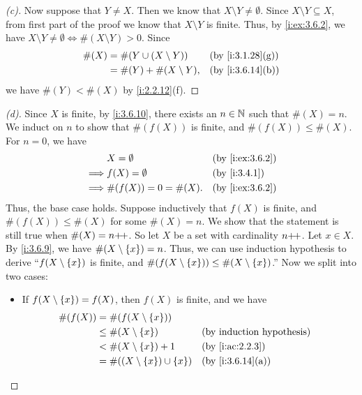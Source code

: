 \begin{proof}[(c)]
  Now suppose that \(Y \neq X\).
  Then we know that \(X \setminus Y \neq \emptyset\).
  Since \(X \setminus Y \subseteq X\), from first part of the proof we know that \(X \setminus Y\) is finite.
  Thus, by \cref{i:ex:3.6.2}, we have \(X \setminus Y \neq \emptyset \iff \#(X \setminus Y) > 0\).
  Since
  \begin{align*}
    \#(X) & = \#(Y \cup (X \setminus Y)) &  & \by{i:3.1.28}[g] \\
          & = \#(Y) + \#(X \setminus Y), &  & \by{i:3.6.14}[b]
  \end{align*}
  we have \(\#(Y) < \#(X)\) by \cref{i:2.2.12}(f).
\end{proof}

\begin{proof}[(d)]
  Since \(X\) is finite, by \cref{i:3.6.10}, there exists an \(n \in \mathbb{N}\) such that \(\#(X) = n\).
  We induct on \(n\) to show that \(\#(f(X))\) is finite, and \(\#(f(X)) \leq \#(X)\).
  For \(n = 0\), we have
  \begin{align*}
             & X = \emptyset         &  & \by{i:ex:3.6.2} \\
    \implies & f(X) = \emptyset      &  & \by{i:3.4.1}    \\
    \implies & \#(f(X)) = 0 = \#(X). &  & \by{i:ex:3.6.2}
  \end{align*}
  Thus, the base case holds.
  Suppose inductively that \(f(X)\) is finite, and \(\#(f(X)) \leq \#(X)\) for some \(\#(X) = n\).
  We show that the statement is still true when \(\#(X) = n{+}\!{+}\).
  So let \(X\) be a set with cardinality \(n{+}\!{+}\).
  Let \(x \in X\).
  By \cref{i:3.6.9}, we have \(\#(X \setminus \left\lbrace x\right\rbrace) = n\).
  Thus, we can use induction hypothesis to derive ``\(f(X \setminus \left\lbrace x\right\rbrace)\) is finite, and \(\#(f(X \setminus \left\lbrace x\right\rbrace)) \leq \#(X \setminus \left\lbrace x\right\rbrace)\).''
  Now we split into two cases:
  \begin{itemize}
    \item If \(f(X \setminus \left\lbrace x\right\rbrace) = f(X)\), then \(f(X)\) is finite, and we have
          \begin{align*}
            \#(f(X)) & = \#(f(X \setminus \set{x}))                                   \\
                     & \leq \#(X \setminus \set{x})             &  & \byIH            \\
                     & < \#(X \setminus \set{x}) + 1            &  & \by{i:ac:2.2.3}  \\
                     & = \#((X \setminus \set{x}) \cup \set{x}) &  & \by{i:3.6.14}[a] \\

\end{align*}
\end{itemize}
\end{proof}
